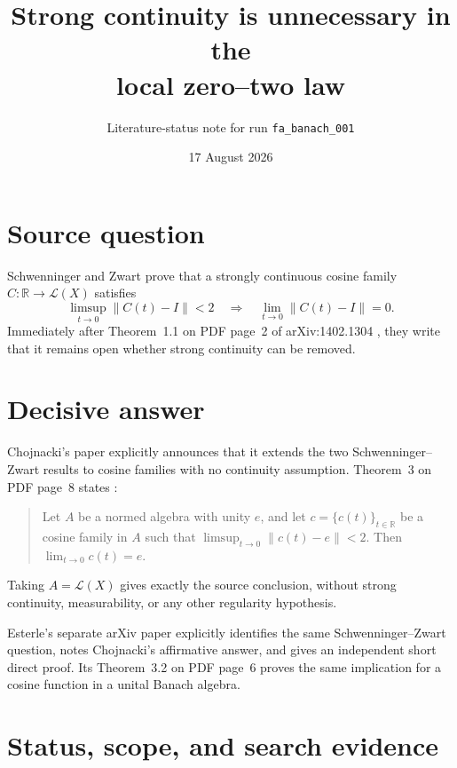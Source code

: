 \documentclass[10pt]{article}
\title{Strong continuity is unnecessary in the\\local zero--two law}
\author{Literature-status note for run \texttt{fa\_banach\_001}}
\date{17 August 2026}
\begin{document}
\maketitle

\begin{center}
\end{center}

\section*{Source question}

Schwenninger and Zwart prove that a strongly continuous cosine family
$C:\mathbb R\to\mathcal L(X)$ satisfies
\[
 \limsup_{t\to0}\|C(t)-I\|<2
 \quad\Longrightarrow\quad
 \lim_{t\to0}\|C(t)-I\|=0.
\]
Immediately after Theorem~1.1 on PDF page~2 of arXiv:1402.1304 \cite{SZ},
they write that it remains open whether strong continuity can be removed.

\section*{Decisive answer}

Chojnacki's paper explicitly announces that it extends the two
Schwenninger--Zwart results to cosine families with no continuity assumption.
Theorem~3 on PDF page~8 states \cite{Chojnacki}:
\begin{quote}
Let $A$ be a normed algebra with unity $e$, and let
$c=\{c(t)\}_{t\in\mathbb R}$ be a cosine family in $A$ such that
$\limsup_{t\to0}\|c(t)-e\|<2$.  Then $\lim_{t\to0}c(t)=e$.
\end{quote}
Taking $A=\mathcal L(X)$ gives exactly the source conclusion, without strong
continuity, measurability, or any other regularity hypothesis.

Esterle's separate arXiv paper \cite{Esterle} explicitly identifies the same
Schwenninger--Zwart question, notes Chojnacki's affirmative answer, and gives
an independent short direct proof.  Its Theorem~3.2 on PDF page~6 proves the
same implication for a cosine function in a unital Banach algebra.

\section*{Status, scope, and search evidence}
\end{document}
